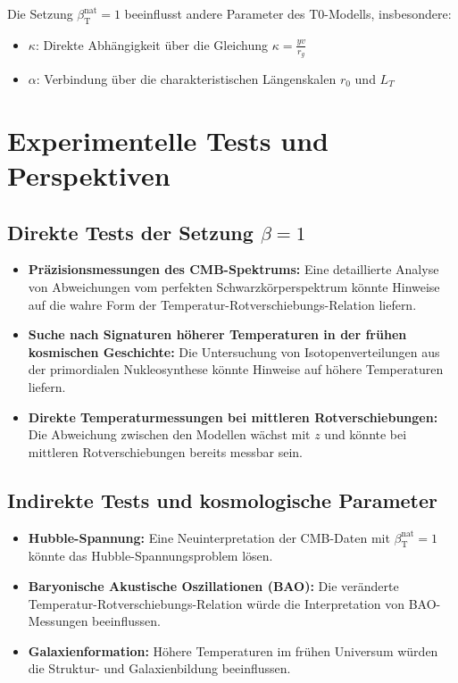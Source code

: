 \documentclass[12pt,a4paper]{article}
\newcommand{\betaT}{\beta_{\text{T}}}
\begin{document}
	Die Setzung \(\betaT^{\text{nat}} = 1\) beeinflusst andere Parameter des T0-Modells, insbesondere:
	\begin{itemize}
		\item \(\kappa\): Direkte Abhängigkeit über die Gleichung \(\kappa = \frac{y v}{r_g}\)
		\item \(\alpha\): Verbindung über die charakteristischen Längenskalen \(r_0\) und \(L_T\)
	\end{itemize}
	
	\section{Experimentelle Tests und Perspektiven}
	
	\subsection{Direkte Tests der Setzung \(\beta = 1\)}
	
	\begin{itemize}
		\item \textbf{Präzisionsmessungen des CMB-Spektrums:} Eine detaillierte Analyse von Abweichungen vom perfekten Schwarzkörperspektrum könnte Hinweise auf die wahre Form der Temperatur-Rotverschiebungs-Relation liefern.
		
		\item \textbf{Suche nach Signaturen höherer Temperaturen in der frühen kosmischen Geschichte:} Die Untersuchung von Isotopenverteilungen aus der primordialen Nukleosynthese könnte Hinweise auf höhere Temperaturen liefern.
		
		\item \textbf{Direkte Temperaturmessungen bei mittleren Rotverschiebungen:} Die Abweichung zwischen den Modellen wächst mit \(z\) und könnte bei mittleren Rotverschiebungen bereits messbar sein.
	\end{itemize}
	
	\subsection{Indirekte Tests und kosmologische Parameter}
	
	\begin{itemize}
		\item \textbf{Hubble-Spannung:} Eine Neuinterpretation der CMB-Daten mit \(\betaT^{\text{nat}} = 1\) könnte das Hubble-Spannungsproblem lösen.
		
		\item \textbf{Baryonische Akustische Oszillationen (BAO):} Die veränderte Temperatur-Rotverschiebungs-Relation würde die Interpretation von BAO-Messungen beeinflussen.
		
		\item \textbf{Galaxienformation:} Höhere Temperaturen im frühen Universum würden die Struktur- und Galaxienbildung beeinflussen.
	\end{itemize}
	
\end{document}
